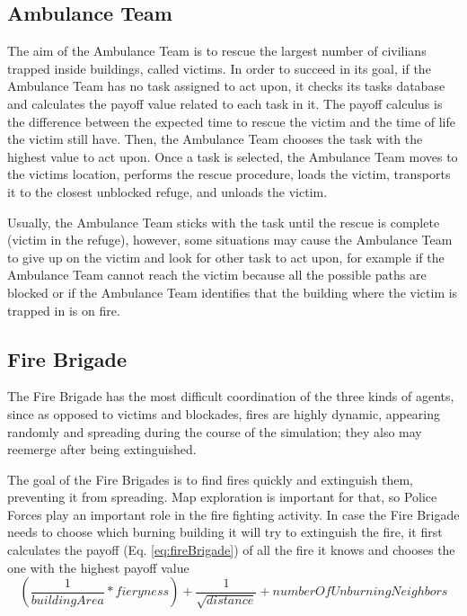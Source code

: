 \documentclass{llncs}
\begin{document}
\subsection{Ambulance Team}
\label{subsec:ambulanceTeam}
The aim of the Ambulance Team is to rescue the largest number of civilians trapped inside buildings, called victims. In order to succeed in its goal, if the Ambulance Team has no task assigned to act upon, it checks its tasks database and calculates the payoff value related to each task in it. The payoff calculus is the difference between the expected time to rescue the victim and the time of life the victim still have. Then, the Ambulance Team chooses the task with the highest value to act upon. Once a task is selected, the Ambulance Team moves to the victims location, performs the rescue procedure, loads the victim, transports it to the closest unblocked refuge, and unloads the victim.

Usually, the Ambulance Team sticks with the task until the rescue is complete (victim in the refuge), however, some situations may cause the Ambulance Team to give up on the victim and look for other task to act upon, for example if the Ambulance Team cannot reach the victim because all the possible paths are blocked or if the Ambulance Team identifies that the building where the victim is trapped in is on fire.
\subsection{Fire Brigade}
\label{subsec:fireBrigade}
The Fire Brigade has the most difficult coordination of the three kinds of agents, since as opposed to victims and blockades, fires are highly dynamic, appearing randomly and spreading during the course of the simulation; they also may reemerge after being extinguished.

The goal of the Fire Brigades is to find fires quickly and extinguish them, preventing it from spreading. Map exploration is important for that, so Police Forces play an important role in the fire fighting activity. In case the Fire Brigade needs to choose which burning building it will try to extinguish the fire, it first calculates the payoff (Eq. \ref{eq:fireBrigade}) of all the fire it knows and chooses the one with the highest payoff value
\begin{equation}
\label{eq:fireBrigade}
\left(\frac{1}{buildingArea} * fieryness\right) + \frac{1}{\sqrt{distance}} + numberOfUnburningNeighbors
\end{equation}
\end{document}
